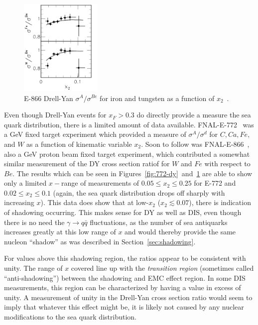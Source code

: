 \begin{figure}
	\centering
	\includegraphics[width=0.35\textwidth]{figures/background/e866-emc-ratio.png}
	\caption{E-866 Drell-Yan $\sigma^A/\sigma^{Be}$ for iron and tungsten as a function of $x_2$~\cite{Vasilev:1999fa}.}
	\label{fig:866-emc}
\end{figure}
Even though Drell-Yan events for $x_F>0.3$ do directly provide a measure the sea quark distribution, there is a limited amount of data available. FNAL-E-772~\cite{PhysRevLett.64.2479} was a \unit[800]{GeV} fixed target experiment which provided a measure of $\sigma^A/\sigma^d$ for $C, Ca, Fe,$ and $W$ as a function of kinematic variable $x_2$. Soon to follow was FNAL-E-866~\cite{Vasilev:1999fa}, also a \unit[800]{GeV} proton beam fixed target experiment, which contributed a somewhat similar measurement of the DY cross section ratiof for $W$ and $Fe$ with respect to $Be$. The results which can be seen in Figures~\ref{fig:772-dy}~and~\ref{fig:866-emc} are able to show only a limited $x-$range of measurements of $0.05\leq x_2\leq 0.25$ for E-772 and $0.02\leq x_2 \leq 0.1$ (again, the sea quark distribution drops off sharply with increasing $x$). This data does show that at low-$x_2$ ($x_2 \lesssim 0.07$), there is indication of shadowing occurring. This makes sense for DY as well as DIS, even though there is no need the $\gamma\rightarrow q\bar{q}$ fluctuations, as the number of sea antiquarks increases greatly at this low range of $x$ and would thereby provide the same nucleon ``shadow'' as was described in Section~\ref{sec:shadowing}. 

For values above this shadowing region, the ratios appear to be consistent with unity. The range of $x$ covered line up with the \emph{transition region} (sometimes called ``anti-shadowing'') between the shadowing and EMC effect region. In some DIS measurements, this region can be characterized by having a value in excess of unity. A measurement of unity in the Drell-Yan cross section ratio would seem to imply that whatever this effect might be, it is likely not caused by any nuclear modifications to the sea quark distribution.

